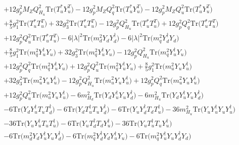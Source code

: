 \begin{align} 
 & +12 g_{p}^{2} M_Z Q_{H_u}^{2} \mbox{Tr}\Big({T_u^*  Y_{u}^{T}}\Big) -12 g_{p}^{2} M_Z Q_{q}^{2} \mbox{Tr}\Big({T_u^*  Y_{u}^{T}}\Big) -12 g_{p}^{2} M_Z Q_{u}^{2} \mbox{Tr}\Big({T_u^*  Y_{u}^{T}}\Big) \nonumber \\ 
 &+\frac{8}{5} g_{1}^{2} \mbox{Tr}\Big({T_u^*  T_{u}^{T}}\Big) +32 g_{3}^{2} \mbox{Tr}\Big({T_u^*  T_{u}^{T}}\Big) -12 g_{p}^{2} Q_{H_u}^{2} \mbox{Tr}\Big({T_u^*  T_{u}^{T}}\Big) +12 g_{p}^{2} Q_{q}^{2} \mbox{Tr}\Big({T_u^*  T_{u}^{T}}\Big) \nonumber \\ 
 &+12 g_{p}^{2} Q_{u}^{2} \mbox{Tr}\Big({T_u^*  T_{u}^{T}}\Big) -6 |\lambda|^2 \mbox{Tr}\Big({m_d^2  Y_d  Y_{d}^{\dagger}}\Big) -6 |\lambda|^2 \mbox{Tr}\Big({m_q^2  Y_{d}^{\dagger}  Y_d}\Big) \nonumber \\ 
 &+\frac{8}{5} g_{1}^{2} \mbox{Tr}\Big({m_q^2  Y_{u}^{\dagger}  Y_u}\Big) +32 g_{3}^{2} \mbox{Tr}\Big({m_q^2  Y_{u}^{\dagger}  Y_u}\Big) -12 g_{p}^{2} Q_{H_u}^{2} \mbox{Tr}\Big({m_q^2  Y_{u}^{\dagger}  Y_u}\Big) \nonumber \\ 
 &+12 g_{p}^{2} Q_{q}^{2} \mbox{Tr}\Big({m_q^2  Y_{u}^{\dagger}  Y_u}\Big) +12 g_{p}^{2} Q_{u}^{2} \mbox{Tr}\Big({m_q^2  Y_{u}^{\dagger}  Y_u}\Big) +\frac{8}{5} g_{1}^{2} \mbox{Tr}\Big({m_u^2  Y_u  Y_{u}^{\dagger}}\Big) \nonumber \\ 
 &+32 g_{3}^{2} \mbox{Tr}\Big({m_u^2  Y_u  Y_{u}^{\dagger}}\Big) -12 g_{p}^{2} Q_{H_u}^{2} \mbox{Tr}\Big({m_u^2  Y_u  Y_{u}^{\dagger}}\Big) +12 g_{p}^{2} Q_{q}^{2} \mbox{Tr}\Big({m_u^2  Y_u  Y_{u}^{\dagger}}\Big) \nonumber \\ 
 &+12 g_{p}^{2} Q_{u}^{2} \mbox{Tr}\Big({m_u^2  Y_u  Y_{u}^{\dagger}}\Big) -6 m_{H_d}^2 \mbox{Tr}\Big({Y_d  Y_{u}^{\dagger}  Y_u  Y_{d}^{\dagger}}\Big) -6 m_{H_u}^2 \mbox{Tr}\Big({Y_d  Y_{u}^{\dagger}  Y_u  Y_{d}^{\dagger}}\Big) \nonumber \\ 
 &-6 \mbox{Tr}\Big({Y_d  Y_{u}^{\dagger}  T_u  T_{d}^{\dagger}}\Big) -6 \mbox{Tr}\Big({Y_d  T_{u}^{\dagger}  T_u  Y_{d}^{\dagger}}\Big) -6 \mbox{Tr}\Big({Y_u  Y_{d}^{\dagger}  T_d  T_{u}^{\dagger}}\Big) -36 m_{H_u}^2 \mbox{Tr}\Big({Y_u  Y_{u}^{\dagger}  Y_u  Y_{u}^{\dagger}}\Big) \nonumber \\ 
 &-36 \mbox{Tr}\Big({Y_u  Y_{u}^{\dagger}  T_u  T_{u}^{\dagger}}\Big) -6 \mbox{Tr}\Big({Y_u  T_{d}^{\dagger}  T_d  Y_{u}^{\dagger}}\Big) -36 \mbox{Tr}\Big({Y_u  T_{u}^{\dagger}  T_u  Y_{u}^{\dagger}}\Big) \nonumber \\ 
 &-6 \mbox{Tr}\Big({m_d^2  Y_d  Y_{u}^{\dagger}  Y_u  Y_{d}^{\dagger}}\Big) -6 \mbox{Tr}\Big({m_q^2  Y_{d}^{\dagger}  Y_d  Y_{u}^{\dagger}  Y_u}\Big) -6 \mbox{Tr}\Big({m_q^2  Y_{u}^{\dagger}  Y_u  Y_{d}^{\dagger}  Y_d}\Big) \nonumber \\ 

\end{align}
